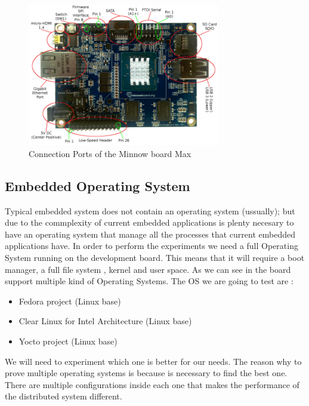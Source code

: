 \begin{figure}[H]
\centering
\includegraphics[width=0.75\textwidth]{images/minnow-max-2.png}
\caption{Connection Ports of the Minnow board Max}
\label{fig:4.2}
\end{figure}

\subsection{Embedded Operating System} 

Typical embedded system does not contain an operating system (ussually); but
due to the commplexity of current embedded applications is plenty necesary to
have an operating system that manage all the processes that current embedded
applications have. In order to perform the experiments we need a full Operating
System running on the development board. This means that it will require a boot
manager, a full file system , kernel and user space.  As we can see in
\cite{minnowboard} the board support multiple kind of Operating Systems. The OS
we are going to test are : 

\begin{itemize}
    \item Fedora project (Linux base) \cite{fedora}
    \item Clear Linux for Intel Architecture (Linux base) \cite{clear-linux}
    \item Yocto project (Linux base) \cite{yocto-project}
\end{itemize}

We will need to experiment which one is better for our needs. The reason why to
prove multiple  operating systems is because is necessary to find the best one.
There are multiple configurations inside each one that makes the performance of
the distributed system different. 

